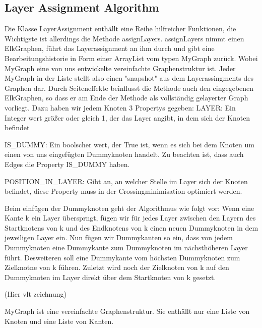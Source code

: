 

\subsection*{Layer Assignment Algorithm}
Die Klasse LayerAssignment enthällt eine Reihe hilfreicher Funktionen, die Wichtigste ist allerdings die Methode assignLayers. assignLayers nimmt einen ElkGraphen, führt das Layerassignment an ihm durch und gibt eine Bearbeitungshistorie in Form einer ArrayList vom typen MyGraph zurück. Wobei MyGraph eine von uns entwickelte vereinfachte Graphenstruktur ist. Jeder MyGraph in der Liste stellt also einen "snapshot" aus dem Layerassingments des Graphen dar.
Durch Seiteneffekte beinflusst die Methode auch den eingegebenen ElkGraphen, so dass er am Ende der Methode als vollständig gelayerter Graph vorliegt. Dazu haben wir jedem Knoten 3 Propertys gegeben:
 LAYER: Ein Integer wert größer oder gleich 1, der das Layer angibt, in dem sich der Knoten befindet

IS\_DUMMY: Ein boolscher wert, der True ist, wenn es sich bei dem Knoten um einen von uns eingefügten Dummyknoten handelt. Zu beachten ist, dass auch Edges die Property IS\_DUMMY haben.

POSITION\_IN\_LAYER: Gibt an, an welcher Stelle im Layer sich der Knoten befindet, diese Property muss in der Crossingminimisation optimiert werden.

Beim einfügen der Dummyknoten geht der Algorithmus wie folgt vor:
Wenn eine Kante k ein Layer übersprngt, fügen wir für jedes Layer zwischen den Layern des Startknotens von k und des Endknotens von k einen neuen Dummyknoten in dem jeweiligen Layer ein. Nun fügen wir Dummykanten so ein, dass von jedem Dummyknoten eine Dummykante zum Dummyknoten im nächsthöheren Layer führt. Desweiteren soll eine Dummykante vom höchsten Dummyknoten zum Zielknotne von k führen. Zuletzt wird noch der Zielknoten von k auf den Dummyknoten im Layer direkt über dem Startknoten von k gesetzt.

(Hier vlt zeichnung)


MyGraph ist eine vereinfachte Graphenstruktur. Sie enthällt nur eine Liste von Knoten und eine Liste von Kanten.  














